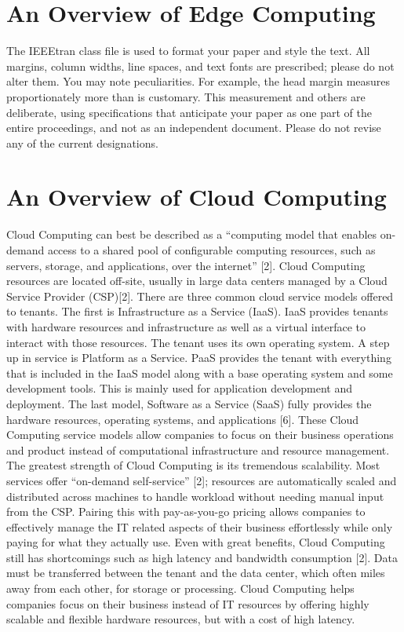 \documentclass[conference]{IEEEtran}
\begin{document}
\section{An Overview of Edge Computing}

The IEEEtran class file is used to format your paper and style the text. All margins, 
column widths, line spaces, and text fonts are prescribed; please do not 
alter them. You may note peculiarities. For example, the head margin
measures proportionately more than is customary. This measurement 
and others are deliberate, using specifications that anticipate your paper 
as one part of the entire proceedings, and not as an independent document. 
Please do not revise any of the current designations.

\section{An Overview of Cloud Computing}
Cloud Computing can best be described as a “computing model that enables on-demand access to a shared pool of configurable computing resources, such as servers, storage, and applications, over the internet” [2]. Cloud Computing resources are located off-site, usually in large data centers managed by a Cloud Service Provider (CSP)[2]. There are three common cloud service models offered to tenants. The first is Infrastructure as a Service (IaaS). IaaS provides tenants with hardware resources and infrastructure as well as a virtual interface to interact with those resources. The tenant uses its own operating system. A step up in service is Platform as a Service. PaaS provides the tenant with everything that is included in the IaaS model along with a base operating system and some development tools. This is mainly used for application development and deployment. The last model, Software as a Service (SaaS) fully provides the hardware resources, operating systems, and applications [6]. These Cloud Computing service models allow companies to focus on their business operations and product instead of computational infrastructure and resource management.
The greatest strength of Cloud Computing is its tremendous scalability. Most services offer “on-demand self-service” [2]; resources are automatically scaled and distributed across machines to handle workload without needing manual input from the CSP. Pairing this with pay-as-you-go pricing allows companies to effectively manage the IT related aspects of their business effortlessly while only paying for what they actually use. Even with great benefits, Cloud Computing still has shortcomings such as high latency and bandwidth consumption [2]. Data must be transferred between the tenant and the data center, which often miles away from each other, for storage or processing. Cloud Computing helps companies focus on their business instead of IT resources by offering highly scalable and flexible hardware resources, but with a cost of high latency.
\end{document}
